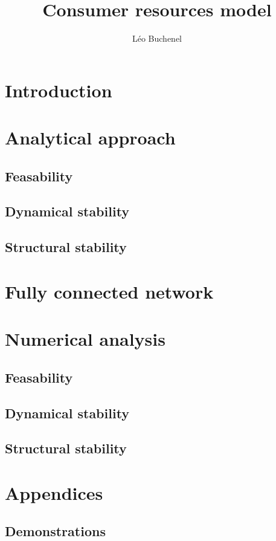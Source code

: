 \documentclass[12pt, titlepage]{report}
\begin{document}
  \title{Consumer resources model}
  \author{L\'eo Buchenel}
  \maketitle
  \tableofcontents
  \chapter{Introduction}
  

  \chapter{Analytical approach}\label{chapter : analytical approach}
  \section{Feasability}
  
  \section{Dynamical stability}
  
  \section{Structural stability}
  

  \chapter{Fully connected network}\label{chapter : fully connected network}
  

  \chapter{Numerical analysis}\label{chapter : numerical analysis}
  \section{Feasability}
  
  \section{Dynamical stability}
  
  \section{Structural stability}
  

%  
  \chapter{Appendices}
  \section{Demonstrations}
  
  \printbibliography
\end{document}
